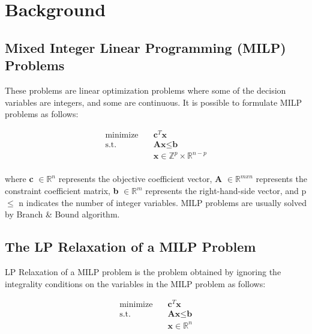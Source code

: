 \section{Background}\label{sec:background}

\subsection{Mixed Integer Linear Programming (MILP) Problems}\label{subsec:mixed-integer-linear-programming-(milp)-problems}
These problems are linear optimization problems where some of the decision variables are integers, and some are continuous.
It is possible to formulate MILP problems as follows:

\begin{equation*}
    \begin{aligned}
        \text{minimize} \quad & \textbf{c}^T \textbf{x} \\
        \text{s.t.} \quad & \textbf{A}\textbf{x} \leq \textbf{b} \\
        & \textbf{x} \in \mathbb{Z}^p \times \mathbb{R}^{n-p}\\
    \end{aligned}\label{eq:equation}
\end{equation*}


where \textbf{c} \begin{math} \in \mathbb{R}^n \end{math} represents the objective coefficient vector, \textbf{A} \begin{math} \in \mathbb{R}^{mxn} \end{math} represents the constraint coefficient matrix, \textbf{b} \begin{math} \in \mathbb{R}^m \end{math} represents the right-hand-side vector, and  p \begin{math} \leq \end{math} n indicates the number of integer variables.
MILP problems are usually solved by Branch \& Bound algorithm.


\subsection{The LP Relaxation of a MILP Problem}\label{subsec:the-lp-relaxation-of-a-milp-problem}
LP Relaxation of a MILP problem is the problem obtained by ignoring the integrality conditions on the variables in the MILP problem as follows:

\begin{equation*}
    \begin{aligned}
        \text{minimize} \quad & \textbf{c}^T \textbf{x} \\
        \text{s.t.} \quad & \textbf{A}\textbf{x} \leq \textbf{b} \\
        & \textbf{x} \in \mathbb{R}^{n}\\
    \end{aligned}\label{eq:equation2}
\end{equation*}


